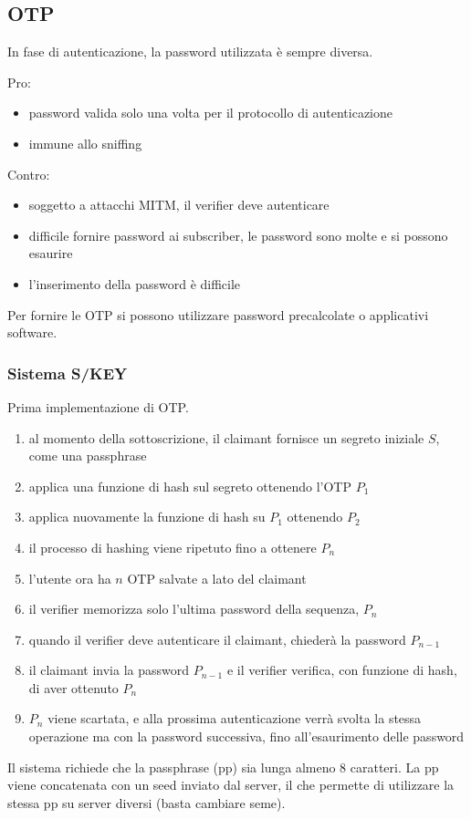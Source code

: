 \documentclass[11pt]{article}
\begin{document}
\subsection{OTP}
In fase di autenticazione, la password utilizzata è sempre diversa.

Pro:
\begin{itemize}
    \item password valida solo una volta per il protocollo di autenticazione 
    \item immune allo sniffing
\end{itemize}

Contro:
\begin{itemize}
    \item soggetto a attacchi MITM, il verifier deve autenticare 
    \item difficile fornire password ai subscriber, le password sono molte e si possono esaurire 
    \item l'inserimento della password è difficile 
\end{itemize}
Per fornire le OTP si possono utilizzare password precalcolate o applicativi software.
\subsubsection{Sistema S/KEY}
Prima implementazione di OTP.
\begin{enumerate}
    \item al momento della sottoscrizione, il claimant fornisce un segreto iniziale $S$, come una passphrase 
    \item applica una funzione di hash sul segreto ottenendo l'OTP $P_1$
    \item applica nuovamente la funzione di hash su $P_1$ ottenendo $P_2$
    \item il processo di hashing viene ripetuto fino a ottenere $P_n$
    \item l'utente ora ha $n$ OTP salvate a lato del claimant
    \item il verifier memorizza solo l'ultima password della sequenza, $P_n$
    \item quando il verifier deve autenticare il claimant, chiederà la password $P_{n-1}$
    \item il claimant invia la password $P_{n-1}$ e il verifier verifica, con funzione di hash, di aver ottenuto $P_n$
    \item $P_n$ viene scartata, e alla prossima autenticazione verrà svolta la stessa operazione ma con la password successiva,
    fino all'esaurimento delle password 
\end{enumerate}
Il sistema richiede che la passphrase (pp) sia lunga almeno 8 caratteri. La pp viene concatenata con un seed inviato dal 
server, il che permette di utilizzare la stessa pp su server diversi (basta cambiare seme).
\end{document}
